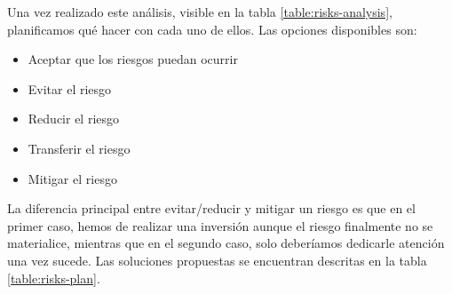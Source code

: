 \documentclass[12pt]{report} %
\begin{document}
Una vez realizado este análisis, visible en la tabla \ref{table:risks-analysis}, planificamos qué hacer con cada uno de ellos. Las opciones disponibles son:

\begin{itemize}
    \item Aceptar que los riesgos puedan ocurrir
    \item Evitar el riesgo
    \item Reducir el riesgo
    \item Transferir el riesgo
    \item Mitigar el riesgo
\end{itemize}

La diferencia principal entre evitar/reducir y mitigar un riesgo es que en el primer caso, hemos de realizar una inversión aunque el riesgo finalmente no se materialice, mientras que en el segundo caso, solo deberíamos dedicarle atención una vez sucede. Las soluciones propuestas se encuentran descritas en la tabla \ref{table:risks-plan}.
\end{document}

